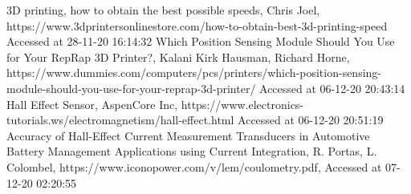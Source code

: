 \documentclass[conference]{IEEEtran}
\begin{document}
\begin{thebibliography}{00}
 3D printing, how to obtain the best possible speeds, Chris Joel, https://www.3dprintersonlinestore.com/how-to-obtain-best-3d-printing-speed Accessed at 28-11-20 16:14:32
 Which Position Sensing Module Should You Use for Your RepRap 3D Printer?, Kalani Kirk Hausman, Richard Horne, https://www.dummies.com/computers/pcs/printers/which-position-sensing-module-should-you-use-for-your-reprap-3d-printer/ Accessed at 06-12-20 20:43:14
 Hall Effect Sensor, AspenCore Inc, https://www.electronics-tutorials.ws/electromagnetism/hall-effect.html Accessed at 06-12-20 20:51:19
 Accuracy of Hall-Effect Current Measurement Transducers in Automotive Battery Management Applications using Current Integration, R. Portas, L. Colombel, https://www.iconopower.com/v/lem/coulometry.pdf, Accessed at 07-12-20 02:20:55
\end{thebibliography}
\end{document}
